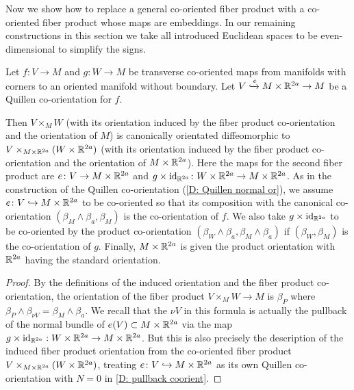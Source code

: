 Now we show how to replace a general co-oriented fiber product with a co-oriented fiber product whose maps are embeddings.
In our remaining constructions in this section we take all introduced Euclidean spaces to be even-dimensional to simplify the signs.

\begin{lemma}
	Let $f \colon V \to M$ and $g \colon W \to M$ be transverse co-oriented maps from manifolds with corners to an oriented manifold without boundary.
	Let $V\xhookrightarrow{e}M \times \mathbb{R}^{2a} \to M$ be a Quillen co-orientation for $f$.

	Then $V \times_M W$ (with its orientation induced by the fiber product co-orientation and the orientation of $M$) is canonically orientated diffeomorphic to $V\times_{M \times \mathbb{R}^{2a}}(W \times \mathbb{R}^{2a})$ (with its orientation induced by the fiber product co-orientation and the orientation of $M \times \mathbb{R}^{2a}$).
	Here the maps for the second fiber product are $e \colon V \to M \times \mathbb{R}^{2a}$ and $g \times \mathrm{id}_{\mathbb{R}^{2a}} \colon W \times \mathbb{R}^{2a} \to M \times \mathbb{R}^{2a}$.
	As in the construction of the Quillen co-orientation (\cref{D: Quillen normal or}), we assume $e \colon V \hookrightarrow M \times \mathbb{R}^{2a}$ to be co-oriented so that its composition with the canonical co-orientation $(\beta_{M}\wedge\beta_a,\beta_M)$ is the co-orientation of $f$.
	We also take $g \times \mathrm{id}_{\mathbb{R}^{2a}}$ to be co-oriented by the product co-orientation $(\beta_W \wedge \beta_a,\beta_M \wedge \beta_a)$ if $(\beta_W,\beta_M)$ is the co-orientation of $g$.
	Finally, $M \times \mathbb{R}^{2a}$ is given the product orientation with $\mathbb{R}^{2a}$ having the standard orientation.
\end{lemma}
\begin{proof}
	By the definitions of the induced orientation and the fiber product co-orientation, the orientation of the fiber product $V \times_M W \to M$ is $\beta_P$ where $\beta_P \wedge \beta_{\nu V} = \beta_M\wedge\beta_a$.
	We recall that the $\nu V$ in this formula is actually the pullback of the normal bundle of $e(V) \subset M \times \mathbb{R}^{2a}$ via the map $g \times \mathrm{id}_{\mathbb{R}^{2a}}: W \times \mathbb{R}^{2a} \to M \times \mathbb{R}^{2a}$.
	But this is also precisely the description of the induced fiber product orientation from the co-oriented fiber product $V\times_{M \times \mathbb{R}^{2a}}(W \times \mathbb{R}^{2a})$, treating $e \colon V \hookrightarrow M \times \mathbb{R}^{2a}$ as its own Quillen co-orientation with $N = 0$ in \cref{D: pullback coorient}.
\end{proof}

